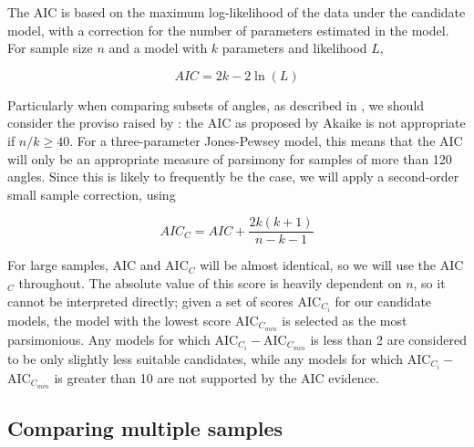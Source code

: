 \documentclass[../../ArchStats.tex]{subfiles}
\begin{document}
The AIC is based on the maximum log-likelihood of the data under the candidate model, with a correction for the number of parameters estimated in the model\cite{Akaike1974}. For sample size $n$ and a model with $k$ parameters and likelihood $L$, 

\[AIC = 2k - 2 \ln (L)\]

Particularly when comparing subsets of angles, as described in , we should consider the proviso raised by \cite{Burnham2004}: the AIC as proposed by Akaike  is not appropriate if $n/k \geq 40$. For a three-parameter Jones-Pewsey model, this means that the AIC will only be an appropriate measure of parsimony for samples of more than 120 angles. Since this is likely to frequently be the case, we will apply a second-order small sample correction, using

\[AIC_C = AIC + \frac{2k(k+1)}{n-k-1} \]

For large samples, AIC and AIC$_C$ will be almost identical, so we will use the AIC$_C$ throughout. The absolute value of this score is heavily dependent on $n$, so it cannot be interpreted directly; given a set of scores AIC$_{C_i}$ for our candidate models, the model with the lowest score AIC$_{C_{min}}$ is selected as the most parsimonious. Any models for which AIC$_{C_i} - $AIC$_{C_{min}}$ is less than 2 are considered to be only slightly less suitable candidates, while any models for which AIC$_{C_i} - $AIC$_{C_{min}}$ is greater than 10 are not supported by the AIC evidence.






\subsection{Comparing multiple samples}
\label{sec:similarity-tests}

\end{document}

